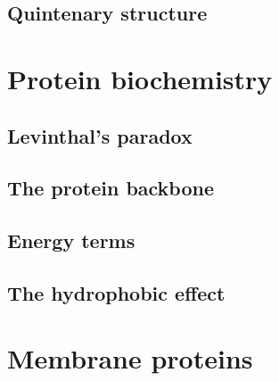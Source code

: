 \subsection{Quintenary structure} %

\section{Protein biochemistry}
\subsection{Levinthal's paradox}
\subsection{The protein backbone}
\subsection{Energy terms} %
\subsection{The hydrophobic effect}

\section{Membrane proteins}
